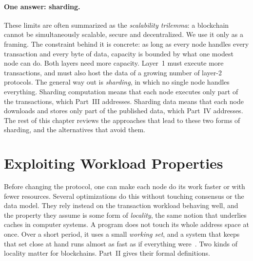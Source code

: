\paragraph{One answer: sharding.}
These limits are often summarized as the \emph{scalability trilemma}: a blockchain cannot be simultaneously scalable, secure and decentralized.
We use it only as a framing.
The constraint behind it is concrete: as long as every node handles every transaction and every byte of data, capacity is bounded by what one modest node can do.
Both layers need more capacity.
Layer~1 must execute more transactions, and must also host the data of a growing number of layer-2 protocols.
The general way out is \emph{sharding}, in which no single node handles everything.
Sharding computation means that each node executes only part of the transactions, which Part~III addresses.
Sharding data means that each node downloads and stores only part of the published data, which Part~IV addresses.
The rest of this chapter reviews the approaches that lead to these two forms of sharding, and the alternatives that avoid them.

\section{Exploiting Workload Properties}\label{sec:bg:workload}


Before changing the protocol, one can make each node do its work faster or with fewer resources.
Several optimizations do this without touching consensus or the data model.
They rely instead on the transaction workload behaving well, and the property they assume is some form of \emph{locality}, the same notion that underlies caches in computer systems.
A program does not touch its whole address space at once.
Over a short period, it uses a small \emph{working set}, and a system that keeps that set close at hand runs almost as fast as if everything were~\cite{denning1968working}.
Two kinds of locality matter for blockchains.
Part~II gives their formal definitions.

